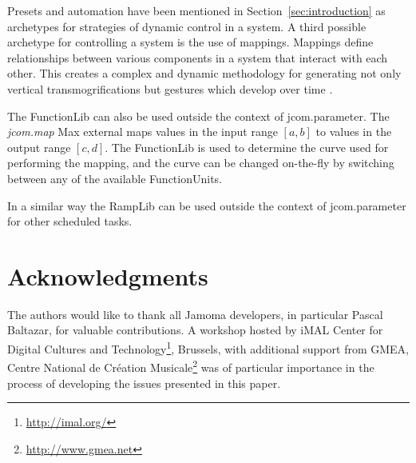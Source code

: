 \documentclass{article}
\begin{document}
Presets and automation have been mentioned in Section~\ref{sec:introduction} as archetypes for strategies of dynamic control in a system. A third possible archetype for controlling a system is the use of mappings. Mappings define relationships between various components in a system that interact with each other. This creates a complex and dynamic methodology for generating not only vertical transmogrifications but gestures which develop over time \cite{Hunt:2003,Nort:2006}.

The FunctionLib can also be used outside the context of jcom.parameter. The \emph{jcom.map} Max external maps values in the input range $[a,b]$ to values in the output range $[c,d]$. The FunctionLib is used to determine the curve used for performing the mapping, and the curve can be changed on-the-fly by switching between any of the available FunctionUnits. 

In a similar way the RampLib can be used outside the context of jcom.parameter for other scheduled tasks.



\section{Acknowledgments} %

The authors would like to thank all Jamoma developers, in particular Pascal Baltazar, for valuable contributions. A workshop hosted by iMAL Center for Digital Cultures and Technology\footnote{\url{http://imal.org/}}, Brussels, with additional support from GMEA, Centre National de Cr\'eation Musicale\footnote{\url{http://www.gmea.net}} was of particular importance in the process of developing the issues presented in this paper.


\end{document}
